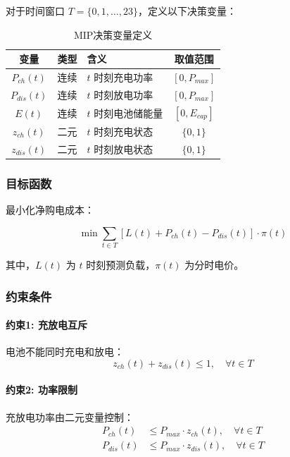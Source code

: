 对于时间窗口 $T = \{0, 1, \ldots, 23\}$，定义以下决策变量：

\begin{table}[htbp]
    \centering
    \caption{MIP决策变量定义}
    \label{tab:mip_vars}
    \begin{tabular}{ccp{6cm}c}
        \toprule
        \textbf{变量}  & \textbf{类型} & \textbf{含义} & \textbf{取值范围}  \\
        \midrule
        $P_{ch}(t)$  & 连续          & $t$ 时刻充电功率  & $[0, P_{max}]$ \\
        $P_{dis}(t)$ & 连续          & $t$ 时刻放电功率  & $[0, P_{max}]$ \\
        $E(t)$       & 连续          & $t$ 时刻电池储能量 & $[0, E_{cap}]$ \\
        $z_{ch}(t)$  & 二元          & $t$ 时刻充电状态  & $\{0, 1\}$     \\
        $z_{dis}(t)$ & 二元          & $t$ 时刻放电状态  & $\{0, 1\}$     \\
        \bottomrule
    \end{tabular}
\end{table}

\subsubsection{目标函数}

最小化净购电成本：

\begin{equation}
    \min \sum_{t \in T} \left[ L(t) + P_{ch}(t) - P_{dis}(t) \right] \cdot \pi(t)
    \label{eq:objective}
\end{equation}

其中，$L(t)$ 为 $t$ 时刻预测负载，$\pi(t)$ 为分时电价。

\subsubsection{约束条件}

\paragraph{约束1: 充放电互斥}
电池不能同时充电和放电：
\begin{equation}
    z_{ch}(t) + z_{dis}(t) \leq 1, \quad \forall t \in T
\end{equation}

\paragraph{约束2: 功率限制}
充放电功率由二元变量控制：
\begin{align}
    P_{ch}(t)  & \leq P_{max} \cdot z_{ch}(t), \quad \forall t \in T  \\
    P_{dis}(t) & \leq P_{max} \cdot z_{dis}(t), \quad \forall t \in T
\end{align}

